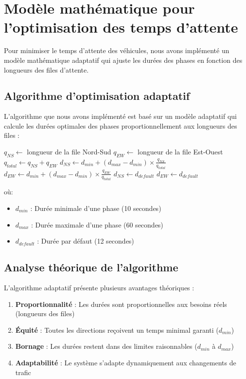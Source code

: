 \documentclass[11pt,a4paper]{article}
\begin{document}
\section{Modèle mathématique pour l'optimisation des temps d'attente}
\label{sec:optimisation}

Pour minimiser le temps d'attente des véhicules, nous avons implémenté un modèle mathématique adaptatif qui ajuste les durées des phases en fonction des longueurs des files d'attente.

\subsection{Algorithme d'optimisation adaptatif}
\label{subsec:algorithme}

L'algorithme que nous avons implémenté est basé sur un modèle adaptatif qui calcule les durées optimales des phases proportionnellement aux longueurs des files :

\begin{algorithm}
\caption{Optimisation adaptative des durées de phases}
\begin{algorithmic}[1]
\State $q_{NS} \gets$ longueur de la file Nord-Sud
\State $q_{EW} \gets$ longueur de la file Est-Ouest
\State $q_{total} \gets q_{NS} + q_{EW}$
    \State $d_{NS} \gets d_{min} + (d_{max} - d_{min}) \times \frac{q_{NS}}{q_{total}}$
    \State $d_{EW} \gets d_{min} + (d_{max} - d_{min}) \times \frac{q_{EW}}{q_{total}}$
\Else
    \State $d_{NS} \gets d_{default}$
    \State $d_{EW} \gets d_{default}$
\EndIf
\end{algorithmic}
\end{algorithm}

où:
\begin{itemize}
    \item $d_{min}$ : Durée minimale d'une phase (10 secondes)
    \item $d_{max}$ : Durée maximale d'une phase (60 secondes)
    \item $d_{default}$ : Durée par défaut (12 secondes)
\end{itemize}
\subsection{Analyse théorique de l'algorithme}
\label{subsec:analyse}

L'algorithme adaptatif présente plusieurs avantages théoriques :

\begin{enumerate}
    \item \textbf{Proportionnalité} : Les durées sont proportionnelles aux besoins réels (longueurs des files)
    \item \textbf{Équité} : Toutes les directions reçoivent un temps minimal garanti ($d_{min}$)
    \item \textbf{Bornage} : Les durées restent dans des limites raisonnables ($d_{min}$ à $d_{max}$)
    \item \textbf{Adaptabilité} : Le système s'adapte dynamiquement aux changements de trafic
\end{enumerate}
\end{document}
